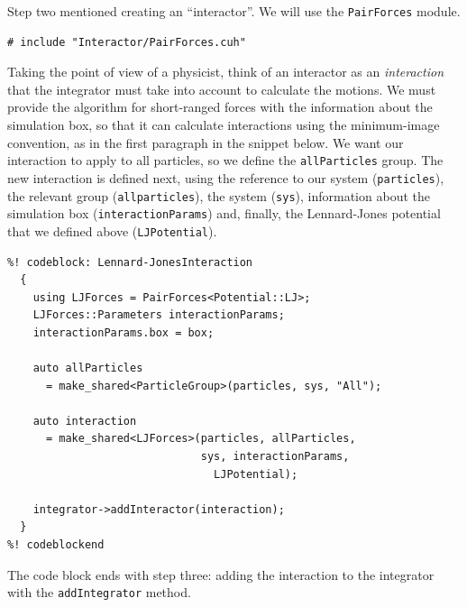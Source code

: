 Step two mentioned creating an ``interactor''. We will use the
\texttt{PairForces} module.
\begin{lstlisting}
# include "Interactor/PairForces.cuh"
\end{lstlisting}

Taking the point of view of a physicist, think of an interactor as an 
\textit{interaction} that the integrator must take into account to calculate the 
motions. We must provide the algorithm for short-ranged forces with the 
information about the simulation box, so that it can calculate interactions 
using the minimum-image convention, as in the first paragraph in the snippet 
below. We want our interaction to apply to all particles, so we define the 
\texttt{allParticles} group. The new interaction is defined next, using the 
reference to our system (\texttt{particles}), the relevant group 
(\texttt{allparticles}), the system (\texttt{sys}), information about the
simulation box (\texttt{interactionParams}) and, finally, the Lennard-Jones
potential that we defined above (\texttt{LJPotential}).
\begin{lstlisting}
%! codeblock: Lennard-JonesInteraction
  {
    using LJForces = PairForces<Potential::LJ>;
    LJForces::Parameters interactionParams;
    interactionParams.box = box;

    auto allParticles
      = make_shared<ParticleGroup>(particles, sys, "All");

    auto interaction
      = make_shared<LJForces>(particles, allParticles,
                              sys, interactionParams,
                                LJPotential);

    integrator->addInteractor(interaction);
  }
%! codeblockend
\end{lstlisting}
The code block ends with step three: adding the interaction to the integrator
with the \texttt{addIntegrator} method.

